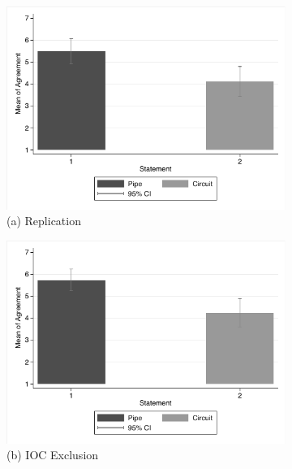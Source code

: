 \documentclass[egregdoesnotlikesansseriftitles,12pt]{scrartcl}
\begin{document}
\begin{landscape}
\begin{figure}[h!]
   \begin{subfigure}[t]{0.28\textwidth}
      \includegraphics[scale=0.7]{figures/cir_rep_bar.pdf}
      \caption{\textsf{\scriptsize(a) Replication}}
      \label{fig:cir_rep_bar}
   \end{subfigure}
   \begin{subfigure}[t]{0.28\textwidth}
      \includegraphics[scale=0.7]{figures/cir_ioc_bar.pdf}
      \caption{\textsf{\scriptsize(b) IOC Exclusion}}
      \label{fig:cir_ioc_bar}
   \end{subfigure}
   \begin{subfigure}[t]{0.28\textwidth}

\end{subfigure}
\end{figure}
\end{landscape}
\end{document}
